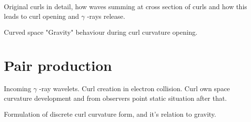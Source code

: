 Original curls in detail, how waves summing at cross section of curls
and how this leads to curl opening and $\gamma$ -rays release.

Curved space "Gravity" behaviour during curl curvature opening.

\section{Pair production}
\label{pair_production}

Incoming $\gamma$ -ray wavelets. Curl creation in electron collision. Curl
own space curvature development and from observers point static situation
after that.

Formulation of discrete curl curvature form, and it's relation to gravity.

\begin{comment}\end{comment}

